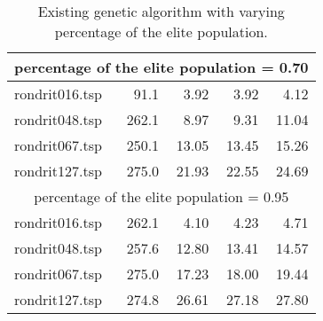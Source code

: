 \begin{table}[H]
{\begin{tabular}{l rrrr}
\midrule
\multicolumn{5}{c}{percentage of the elite population = 0.70}\\ 
\midrule
rondrit016.tsp & 91.1 & 3.92 & 3.92 & 4.12 \\
rondrit048.tsp & 262.1 & 8.97 & 9.31 & 11.04 \\
rondrit067.tsp & 250.1 & 13.05 & 13.45 & 15.26 \\
rondrit127.tsp & 275.0 & 21.93 & 22.55 & 24.69 \\
\midrule
\multicolumn{5}{c}{percentage of the elite population = 0.95}\\ 
\midrule
rondrit016.tsp & 262.1 & 4.10 & 4.23 & 4.71 \\
rondrit048.tsp & 257.6 & 12.80 & 13.41 & 14.57 \\
rondrit067.tsp & 275.0 & 17.23 & 18.00 & 19.44 \\
rondrit127.tsp & 274.8 & 26.61 & 27.18 & 27.80 \\
\bottomrule 
\end{tabular} 
}
\caption{Existing genetic algorithm with varying percentage of the elite population.}
\label{tab:vary_elitism}
\end{table}
